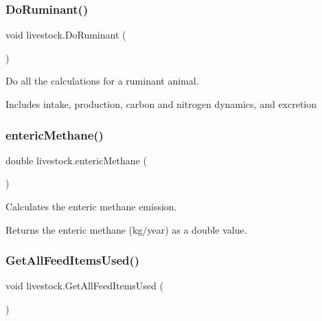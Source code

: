 \subsubsection{\texorpdfstring{DoRuminant()}{DoRuminant()}}
{\footnotesize\ttfamily void livestock.\+Do\+Ruminant (\begin{DoxyParamCaption}{ }\end{DoxyParamCaption})\hspace{0.3cm}{\ttfamily [inline]}}



Do all the calculations for a ruminant animal. 

Includes intake, production, carbon and nitrogen dynamics, and excretion \mbox{\label{classlivestock_afc3c7bb93fede893404fb7d5d8daa0e3}} 
\subsubsection{\texorpdfstring{entericMethane()}{entericMethane()}}
{\footnotesize\ttfamily double livestock.\+enteric\+Methane (\begin{DoxyParamCaption}{ }\end{DoxyParamCaption})\hspace{0.3cm}{\ttfamily [inline]}}



Calculates the enteric methane emission. 

\begin{DoxyReturn}{Returns}
the enteric methane (kg/year) as a double value. 
\end{DoxyReturn}
\mbox{\label{classlivestock_a4c32851ffda591d69f9c5d6914cb6150}} 
\subsubsection{\texorpdfstring{GetAllFeedItemsUsed()}{GetAllFeedItemsUsed()}}
{\footnotesize\ttfamily void livestock.\+Get\+All\+Feed\+Items\+Used (\begin{DoxyParamCaption}{ }\end{DoxyParamCaption})\hspace{0.3cm}{\ttfamily [inline]}}



